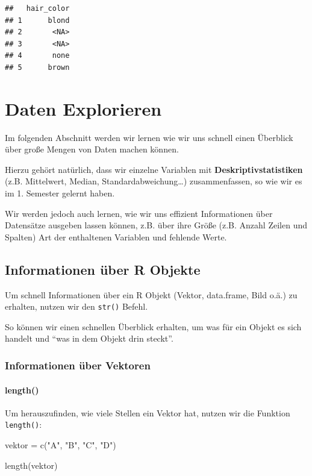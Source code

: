 \documentclass[
]{book}
\newenvironment{Shaded}{\begin{snugshade}}{\end{snugshade}}
\newcommand{\FunctionTok}[1]{\textcolor[rgb]{0.00,0.00,0.00}{#1}}
\newcommand{\NormalTok}[1]{#1}
\newcommand{\OtherTok}[1]{\textcolor[rgb]{0.56,0.35,0.01}{#1}}
\newcommand{\StringTok}[1]{\textcolor[rgb]{0.31,0.60,0.02}{#1}}
\begin{document}
\begin{verbatim}
##   hair_color
## 1      blond
## 2       <NA>
## 3       <NA>
## 4       none
## 5      brown
\end{verbatim}

\hypertarget{daten-explorieren}{%
\chapter{Daten Explorieren}\label{daten-explorieren}}

Im folgenden Abschnitt werden wir lernen wie wir uns schnell einen Überblick über große Mengen von Daten machen können.

Hierzu gehört natürlich, dass wir einzelne Variablen mit \textbf{Deskriptivstatistiken} (z.B. Mittelwert, Median, Standardabweichung\ldots) zusammenfassen, so wie wir es im 1. Semester gelernt haben.

Wir werden jedoch auch lernen, wie wir uns effizient Informationen über Datensätze ausgeben lassen können, z.B. über ihre Größe (z.B. Anzahl Zeilen und Spalten) Art der enthaltenen Variablen und fehlende Werte.

\hypertarget{informationen-uxfcber-r-objekte}{%
\section{Informationen über R Objekte}\label{informationen-uxfcber-r-objekte}}

Um schnell Informationen über ein R Objekt (Vektor, data.frame, Bild o.ä.) zu erhalten, nutzen wir den \texttt{str()} Befehl.

So können wir einen schnellen Überblick erhalten, um was für ein Objekt es sich handelt und ``was in dem Objekt drin steckt''.

\hypertarget{informationen-uxfcber-vektoren}{%
\subsection{Informationen über Vektoren}\label{informationen-uxfcber-vektoren}}

\hypertarget{length}{%
\subsubsection{length()}\label{length}}

Um herauszufinden, wie viele Stellen ein Vektor hat, nutzen wir die Funktion \texttt{length()}:

\begin{Shaded}
\begin{Highlighting}[]
\NormalTok{vektor }\OtherTok{=} \FunctionTok{c}\NormalTok{(}\StringTok{"A"}\NormalTok{, }\StringTok{"B"}\NormalTok{, }\StringTok{"C"}\NormalTok{, }\StringTok{"D"}\NormalTok{)}

\FunctionTok{length}\NormalTok{(vektor)}
\end{Highlighting}
\end{Shaded}
\end{document}
